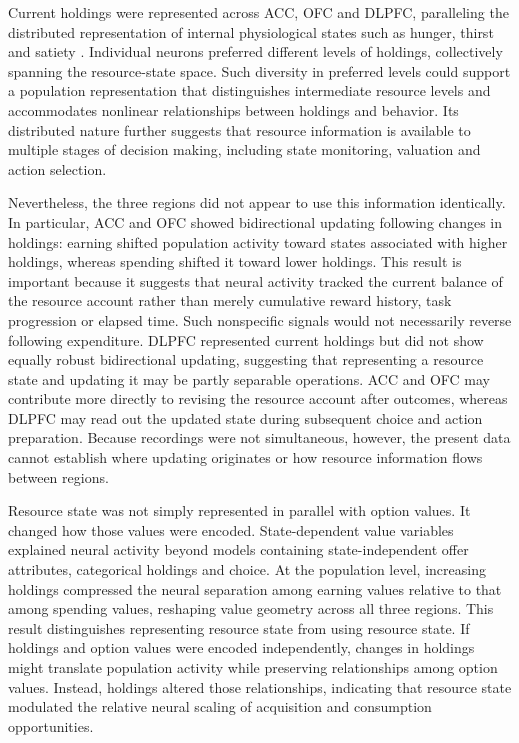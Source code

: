 \documentclass[pdflatex,sn-mathphys-num]{sn-jnl}%
\begin{document}
Current holdings were represented across ACC, OFC and DLPFC, paralleling the distributed representation of internal physiological states such as hunger, thirst and satiety \citep{dearaujo2006ensemble,allen2019thirst,encarnacionrivera2025drives}. Individual neurons preferred different levels of holdings, collectively spanning the resource-state space. Such diversity in preferred levels could support a population representation that distinguishes intermediate resource levels and accommodates nonlinear relationships between holdings and behavior. Its distributed nature further suggests that resource information is available to multiple stages of decision making, including state monitoring, valuation and action selection.

Nevertheless, the three regions did not appear to use this information identically. In particular, ACC and OFC showed bidirectional updating following changes in holdings: earning shifted population activity toward states associated with higher holdings, whereas spending shifted it toward lower holdings. This result is important because it suggests that neural activity tracked the current balance of the resource account rather than merely cumulative reward history, task progression or elapsed time. Such nonspecific signals would not necessarily reverse following expenditure. DLPFC represented current holdings but did not show equally robust bidirectional updating, suggesting that representing a resource state and updating it may be partly separable operations. ACC and OFC may contribute more directly to revising the resource account after outcomes, whereas DLPFC may read out the updated state during subsequent choice and action preparation. Because recordings were not simultaneous, however, the present data cannot establish where updating originates or how resource information flows between regions.

Resource state was not simply represented in parallel with option values. It changed how those values were encoded. State-dependent value variables explained neural activity beyond models containing state-independent offer attributes, categorical holdings and choice. At the population level, increasing holdings compressed the neural separation among earning values relative to that among spending values, reshaping value geometry across all three regions. This result distinguishes representing resource state from using resource state. If holdings and option values were encoded independently, changes in holdings might translate population activity while preserving relationships among option values. Instead, holdings altered those relationships, indicating that resource state modulated the relative neural scaling of acquisition and consumption opportunities.
\end{document}

